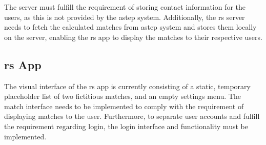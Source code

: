 The server must fulfill the requirement of storing contact information for the users, as this is not provided by the \gls{astep} system.
Additionally, the \gls{rs} server needs to fetch the calculated matches from \gls{astep} system and stores them locally on the server, enabling the \gls{rs} app to display the matches to their respective users.


\subsection{\gls{rs} App}
The visual interface of the \gls{rs} app is currently consisting of a static, temporary placeholder list of two fictitious matches, and an empty settings menu.
The match interface needs to be implemented to comply with the requirement of displaying matches to the user. Furthermore, to separate user accounts and fulfill the requirement regarding login, the login interface and functionality must be implemented.